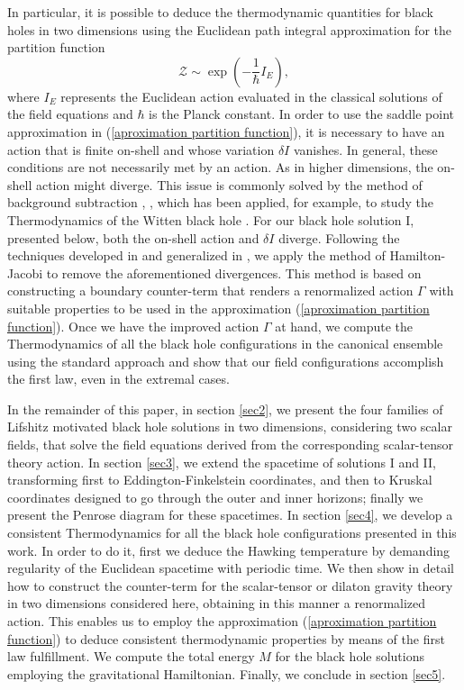 \documentclass[sn-mathphys,Numbered]{sn-jnl}%
\theoremstyle{thmstyleone}%
\theoremstyle{thmstyletwo}%
\theoremstyle{thmstylethree}%
\begin{document}
    In particular, it is possible to deduce the thermodynamic quantities for black holes in two dimensions using the Euclidean path integral approximation for the partition function \cite{Gibbons}
%
\begin{equation} \label{aproximation partition function}
\mathcal{Z} \sim \exp \left(-\frac{1}{\hbar} I_E\right),
\end{equation}
%
where $I_E$ represents the Euclidean action evaluated in the classical solutions of  the field equations and $\hbar$ is the Planck constant. In order to use the saddle point approximation in (\ref{aproximation partition function}), it is necessary to have an action that is finite on-shell and whose variation $\delta I$ vanishes. In general, these conditions are not necessarily met by an action. As in higher dimensions, the on-shell action might diverge. This issue is commonly solved by the method of background subtraction \cite{Gibbons}, \cite{Liebl}, which has been applied, for example, to study the Thermodynamics of the Witten black hole \cite{Perry, McGuigan,Nappi}. For our black hole solution I, presented below,  both the on-shell action and $\delta I$ diverge. Following the techniques developed in \cite{Davis} and generalized in \cite{Grumiller}, we apply the method of Hamilton-Jacobi \cite{Martelli} to remove the aforementioned divergences. This method is based on constructing a boundary counter-term that renders a renormalized action $\Gamma$ with suitable properties 
to be used in the approximation (\ref{aproximation partition function}). Once we have the improved action $\Gamma$ at hand, 
we compute the Thermodynamics of all the black hole configurations in the canonical ensemble using the standard approach and show that our field configurations accomplish the first law, even in the extremal cases.
    
    
    In the remainder of this paper, in section \ref{sec2}, we present the four families of Lifshitz motivated black hole solutions in two dimensions, considering two scalar fields, that solve the field equations derived from the corresponding scalar-tensor theory action. In section \ref{sec3}, we extend the spacetime of solutions I and II, transforming first to Eddington-Finkelstein coordinates, and then to Kruskal coordinates designed to go through the outer and inner horizons; finally we present the Penrose diagram for these spacetimes. In section \ref{sec4}, we develop a consistent Thermodynamics for all the black hole configurations presented in this work. In order to do it, first we deduce the Hawking temperature by demanding regularity of the Euclidean spacetime with periodic time. We then show in detail how to construct the counter-term  for the scalar-tensor or dilaton gravity theory in two dimensions considered here, obtaining in this manner a renormalized action. This enables us to employ the approximation (\ref{aproximation partition function}) to deduce consistent thermodynamic properties by means of the first law fulfillment. We compute the total energy $M$ for the black hole solutions employing the gravitational Hamiltonian. Finally, we conclude in section \ref{sec5}.
   
\end{document}
